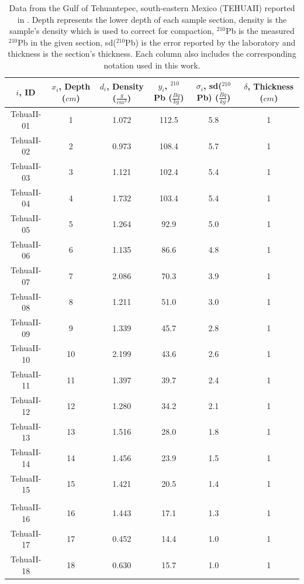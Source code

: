 \documentclass [10pt] {article}
\begin{document}
\begin{table}[h!]
\centering
    \begin{tabular}{|c| c| c| c| c| c|}
\hline
	    $i$, ID & $x_i$, Depth ($cm$)  & $d_i$, Density ($\frac{g}{cm^3}$)  & $y_i$, $^{210}$Pb ($\frac{Bq}{kg}$) & $\sigma_i$, sd($^{210}$Pb) ($\frac{Bq}{kg}$) & $\delta$, Thickness ($cm$)   \\
\hline
TehuaII-01 & 1 & 1.072 & 112.5 & 5.8 & 1 \\
TehuaII-02 & 2 & 0.973 & 108.4 & 5.7 & 1 \\
TehuaII-03 & 3 & 1.121 & 102.4 & 5.4 & 1 \\
TehuaII-04 & 4 & 1.732 & 103.4 & 5.4 & 1 \\
TehuaII-05 & 5 & 1.264 & 92.9 & 5.0 & 1 \\
TehuaII-06 & 6 & 1.135 & 86.6 & 4.8 & 1 \\
TehuaII-07 & 7 & 2.086 & 70.3 & 3.9 & 1 \\
TehuaII-08 & 8 & 1.211 & 51.0 & 3.0 & 1 \\
TehuaII-09 & 9 & 1.339 & 45.7 & 2.8 & 1 \\
TehuaII-10 & 10 & 2.199 & 43.6 & 2.6 & 1 \\
TehuaII-11 & 11 & 1.397 & 39.7 & 2.4 & 1 \\
TehuaII-12 & 12 & 1.280 & 34.2 & 2.1 & 1 \\
TehuaII-13 & 13 & 1.516 & 28.0 & 1.8 & 1 \\
TehuaII-14 & 14 & 1.456 & 23.9 & 1.5 & 1 \\
TehuaII-15 & 15 & 1.421 & 20.5 & 1.4 & 1 \\
\hline
\dotfill \\
TehuaII-16 & 16 & 1.443 & 17.1 & 1.3 & 1 \\
TehuaII-17 & 17 & 0.452 & 14.4 & 1.0 & 1 \\
TehuaII-18 & 18 & 0.630 & 15.7 & 1.0 & 1 \\\hline
    \end{tabular}
	\caption{Data from the Gulf of Tehuantepec, south-eastern Mexico (TEHUAII) reported in \citet{Sanchez-Cabeza2012}. Depth represents the lower depth of each sample section, density is the sample's density which is used to correct for compaction, $^{210}$Pb is the measured $^{210}$Pb in the given section, sd($^{210}$Pb) is the error reported by the laboratory and thickness is the section's thickness. Each column also includes the corresponding notation used in this work.}
	\label{tab:tehuaii}
\end{table}
\end{document}
